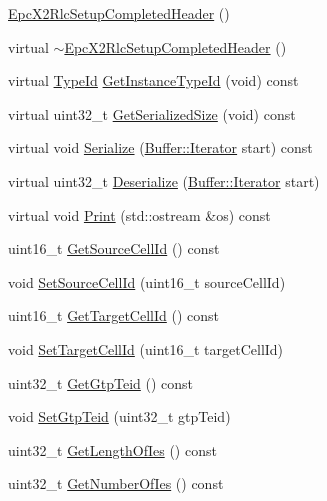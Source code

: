 \begin{DoxyCompactItemize}
\item 
\hyperlink{classns3_1_1EpcX2RlcSetupCompletedHeader_af1e28d6c6de5a71d5d2ceedaf0c92d42}{Epc\+X2\+Rlc\+Setup\+Completed\+Header} ()
\item 
virtual \hyperlink{classns3_1_1EpcX2RlcSetupCompletedHeader_abd3e77cad3a13b828d128a5d1cc2b023}{$\sim$\+Epc\+X2\+Rlc\+Setup\+Completed\+Header} ()
\item 
virtual \hyperlink{classns3_1_1TypeId}{Type\+Id} \hyperlink{classns3_1_1EpcX2RlcSetupCompletedHeader_aa12ae3a4eacd490f397a02e3dc0b8ade}{Get\+Instance\+Type\+Id} (void) const 
\item 
virtual uint32\+\_\+t \hyperlink{classns3_1_1EpcX2RlcSetupCompletedHeader_af5470e96bdc3bac5ba6579ecbff62014}{Get\+Serialized\+Size} (void) const 
\item 
virtual void \hyperlink{classns3_1_1EpcX2RlcSetupCompletedHeader_a974daabdd879d8a84b9e2de2f7334a9b}{Serialize} (\hyperlink{classns3_1_1Buffer_1_1Iterator}{Buffer\+::\+Iterator} start) const 
\item 
virtual uint32\+\_\+t \hyperlink{classns3_1_1EpcX2RlcSetupCompletedHeader_a5783e770215cc2853cd660b8384cf03a}{Deserialize} (\hyperlink{classns3_1_1Buffer_1_1Iterator}{Buffer\+::\+Iterator} start)
\item 
virtual void \hyperlink{classns3_1_1EpcX2RlcSetupCompletedHeader_aba8da6b5bc2668d68051a05cccdca9ad}{Print} (std\+::ostream \&os) const 
\item 
uint16\+\_\+t \hyperlink{classns3_1_1EpcX2RlcSetupCompletedHeader_a7ecd5f712a069ac9d40ffbfe08d5c9d6}{Get\+Source\+Cell\+Id} () const 
\item 
void \hyperlink{classns3_1_1EpcX2RlcSetupCompletedHeader_a3c92b9514a9aa89649655976ad5cdf0c}{Set\+Source\+Cell\+Id} (uint16\+\_\+t source\+Cell\+Id)
\item 
uint16\+\_\+t \hyperlink{classns3_1_1EpcX2RlcSetupCompletedHeader_a3a0784ddb0c50fdaf80fbd8cda3e7929}{Get\+Target\+Cell\+Id} () const 
\item 
void \hyperlink{classns3_1_1EpcX2RlcSetupCompletedHeader_a03b5070f3a470a387be6a187d02ed5e5}{Set\+Target\+Cell\+Id} (uint16\+\_\+t target\+Cell\+Id)
\item 
uint32\+\_\+t \hyperlink{classns3_1_1EpcX2RlcSetupCompletedHeader_a0cb0563e9e873d3f3986a64ccafd6b0f}{Get\+Gtp\+Teid} () const 
\item 
void \hyperlink{classns3_1_1EpcX2RlcSetupCompletedHeader_af03342411943a82cb353ccf51b3bec51}{Set\+Gtp\+Teid} (uint32\+\_\+t gtp\+Teid)
\item 
uint32\+\_\+t \hyperlink{classns3_1_1EpcX2RlcSetupCompletedHeader_a2948d327b1e79e76aa181d546f46fc60}{Get\+Length\+Of\+Ies} () const 
\item 
uint32\+\_\+t \hyperlink{classns3_1_1EpcX2RlcSetupCompletedHeader_adf200a68ac3dfa6e0a5f053c726b6fa0}{Get\+Number\+Of\+Ies} () const 
\end{DoxyCompactItemize}

